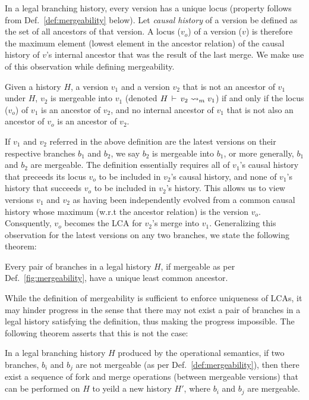 In a legal branching history, every version has a unique locus
(property follows from Def.~\ref{def:mergeability} below). Let
\emph{causal history} of a version be defined as the set of all
ancestors of that version. A locus ($v_o$) of a version ($v$) is
therefore the maximum element (lowest element in the ancestor
relation) of the causal history of $v$'s internal ancestor that was
the result of the last merge. We make use of this observation while
defining mergeability. 

\begin{definition} 
\label{def:mergeability}
Given a history $H$, a version $v_1$ and a version $v_2$ that is not
an ancestor of $v_1$ under $H$, $v_2$ is mergeable into $v_1$ (denoted
$H\,\vdash\,v_2 \rightsquigarrow_m v_1$) if and only if the locus ($v_o$) of
$v_1$ is an ancestor of $v_2$, and no internal ancestor of $v_1$ that
is not also an ancestor of $v_o$ is an ancestor of $v_2$.    
\end{definition}

If $v_1$ and $v_2$ referred in the above definition are the latest
versions on their respective branches $b_1$ and $b_2$, we say $b_2$ is
mergeable into $b_1$, or more generally, $b_1$ and $b_2$ are
mergeable. The definition essentially requires all of $v_1$'s causal
history that preceeds its locus $v_o$ to be included in $v_2$'s causal
history, and none of $v_1$'s history that succeeds $v_o$ to be
included in $v_2$'s history. This allows us to view versions $v_1$ and
$v_2$ as having been independently evolved from a common causal
history whose maximum (w.r.t the ancestor relation) is the version
$v_o$. Consquently, $v_o$ becomes the LCA for $v_2$'s merge into
$v_1$. Generalizing this observation for the latest versions on
any two branches, we state the following theorem:

\begin{theorem} 
Every pair of branches in a legal history $H$, if mergeable as per
Def.~\ref{fig:mergeability}, have a unique least common ancestor.
\end{theorem}

While the definition of mergeability is sufficient to enforce
uniqueness of LCAs, it may hinder progress in the sense that there may
not exist a pair of branches in a legal history satisfying the
definition, thus making the progress impossible. The following theorem
asserts that this is not the case:

\begin{theorem} 
In a legal branching history $H$ produced by the operational
semantics, if two branches, $b_i$ and $b_j$ are not mergeable (as per
Def.~\ref{def:mergeability}), then there exist a sequence of fork and
merge operations (between mergeable versions) that can be performed on
$H$ to yeild a new history $H'$, where $b_i$ and $b_j$ are mergeable.  
\end{theorem}

